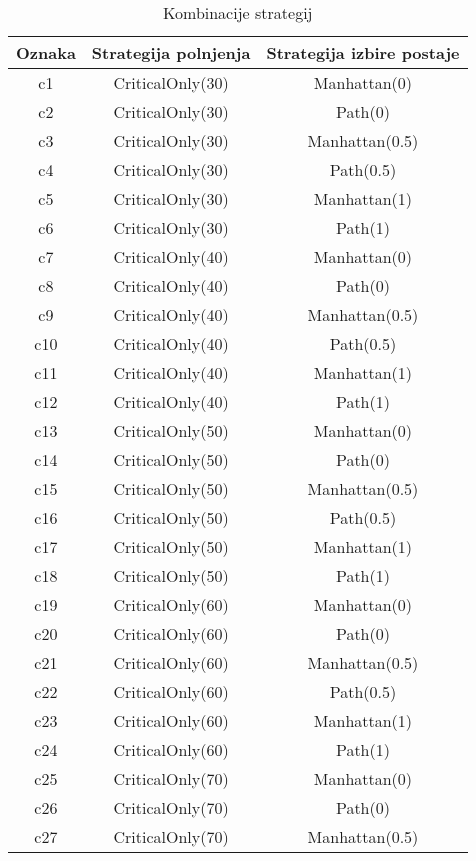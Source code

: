 \begin{table}[H]
\caption{Kombinacije strategij}
\label{tab:kombinacije_strategij}
\centering
\begin{tabular}{|c|c|c|}
\hline
Oznaka & Strategija polnjenja & Strategija izbire postaje \\
\hline
c1 & CriticalOnly(30) & Manhattan(0) \\
\hline
c2 & CriticalOnly(30) & Path(0) \\
\hline
c3 & CriticalOnly(30) & Manhattan(0.5) \\
\hline
c4 & CriticalOnly(30) & Path(0.5) \\
\hline
c5 & CriticalOnly(30) & Manhattan(1) \\
\hline
c6 & CriticalOnly(30) & Path(1) \\
\hline
c7 & CriticalOnly(40) & Manhattan(0) \\
\hline
c8 & CriticalOnly(40) & Path(0) \\
\hline
c9 & CriticalOnly(40) & Manhattan(0.5) \\
\hline
c10 & CriticalOnly(40) & Path(0.5) \\
\hline
c11 & CriticalOnly(40) & Manhattan(1) \\
\hline
c12 & CriticalOnly(40) & Path(1) \\
\hline
c13 & CriticalOnly(50) & Manhattan(0) \\
\hline
c14 & CriticalOnly(50) & Path(0) \\
\hline
c15 & CriticalOnly(50) & Manhattan(0.5) \\
\hline
c16 & CriticalOnly(50) & Path(0.5) \\
\hline
c17 & CriticalOnly(50) & Manhattan(1) \\
\hline
c18 & CriticalOnly(50) & Path(1) \\
\hline
c19 & CriticalOnly(60) & Manhattan(0) \\
\hline
c20 & CriticalOnly(60) & Path(0) \\
\hline
c21 & CriticalOnly(60) & Manhattan(0.5) \\
\hline
c22 & CriticalOnly(60) & Path(0.5) \\
\hline
c23 & CriticalOnly(60) & Manhattan(1) \\
\hline
c24 & CriticalOnly(60) & Path(1) \\
\hline
c25 & CriticalOnly(70) & Manhattan(0) \\
\hline
c26 & CriticalOnly(70) & Path(0) \\
\hline
c27 & CriticalOnly(70) & Manhattan(0.5) \\

\end{tabular}
\end{table}
